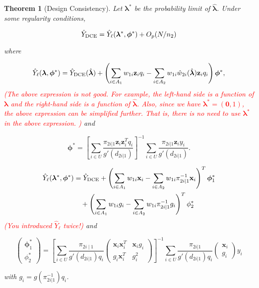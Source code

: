\documentclass[12pt]{article}
\newtheorem{theorem}{Theorem}
\newcommand{\bx}{\mathbf{x}}
\renewcommand{\bf}[1]{\mathbf{#1}}
\begin{document}
\begin{theorem}[Design Consistency]\label{thm:dc1}
  Let $\bm \lambda^*$ be the probability limit of $\hat{\bm \lambda}$.
  Under some regularity conditions,

  $$\hat Y_{\rm DCE} = \hat Y_\ell(\bm \lambda^*, \bm \phi^*) + O_p(N / n_2)$$

  where

  $$
  \hat Y_{\ell}(\bm \lambda, \bm \phi^*) = \hat Y_{\rm DCE}(\hat{\bm \lambda}) + 
  \left(\sum_{i \in A_1} w_{1i} \bf z_i q_i - \sum_{i \in A_2} w_{1i} \hat w_{2i}(
  \hat{\bm \lambda}) \bf z_i q_i\right)\bm \phi^*,
  $$
\textcolor{red}{(The above expression is not good. For example, the left-hand side is a function of $\bm \lambda$ and the right-hand side is a function of $\hat{\bm \lambda}$. Also, since we have $\bm \lambda^*=( \mathbf{0}, 1)$, the above expression can be simplified further. That is, there is no need to use $\bm \lambda^*$ in the above expression. ) }
  and

  $$
  \bm \phi^* = 
  \left[\sum_{i \in U} \frac{\pi_{2i|1}\bf z_i \bf z_i^T q_i}{g'(d_{2i|1})}\right]^{-1}
  \sum_{i \in U} \frac{\pi_{2i|1}\bf z_i y_i}{g'(d_{2i|1})}.
  $$

   \begin{align*}
   \hat Y_{\ell}(\bm \lambda^*, \bm \phi^*) 
   &= \hat{Y}_{\rm DCE} + \left(\sum_{i \in A_1} w_{1i} \bf x_i  -
     \sum_{i \in A_2} w_{1i} \pi_{2i \mid 1}^{-1} \bf x_i  \right)^T \bm \phi_1^* \\
   &\quad+ \left(\sum_{i \in A_1} w_{1i} g_i  -
  \sum_{i \in A_2} w_{1i} \pi_{2i \mid 1}^{-1}g_i  \right)^T \phi_2^*  
  \end{align*} 
\textcolor{red}{(You introduced $\hat{Y}_{\ell}$ twice!)}
  and  

  $$
  \begin{pmatrix}
  \bm \phi_1^* \\
  \phi_2^* 
  \end{pmatrix}
  = \left[ \sum_{i \in U} \frac{\pi_{2i \mid 1} }{ g'(d_{2i|1}) q_i} 
  \begin{pmatrix}
  \bx_i \bx_i^T &   \bx_i g_i   \\
  g_i  \bx_i^T   & g_i^2     
  \end{pmatrix} \right]^{-1}
  \sum_{i \in U} \frac{\pi_{2i|1}}{ g'(d_{2i | 1}) q_i} 
  \begin{pmatrix}
    \bx_i \\ g_i 
  \end{pmatrix}y_i 
  $$

with $g_i = g( \pi_{2i |1}^{-1}) q_i$.
\end{theorem}
\end{document}
